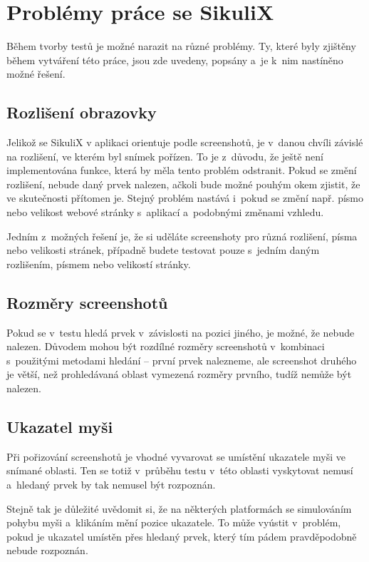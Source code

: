 \chapter{Problémy práce se SikuliX}
Během tvorby testů je možné narazit na různé problémy. Ty, které byly zjištěny během vytváření této práce, jsou zde uvedeny, popsány a~je k~nim nastíněno možné řešení.

	\section{Rozlišení obrazovky}
	Jelikož se SikuliX v aplikaci orientuje podle screenshotů, je v~danou chvíli závislé na rozlišení, ve kterém byl snímek pořízen. To je z~důvodu, že ještě není implementována funkce, která by měla tento problém odstranit. Pokud se změní rozlišení, nebude daný prvek nalezen, ačkoli bude možné pouhým okem zjistit, že ve skutečnosti přítomen je. Stejný problém nastává i~pokud se změní např. písmo nebo velikost webové stránky s~aplikací a~podobnými změnami vzhledu.
	
	Jedním z~možných řešení je, že si uděláte screenshoty pro různá rozlišení, písma nebo velikosti stránek, případně budete testovat pouze s~jedním daným rozlišením, písmem nebo velikostí stránky.
	
	\section{Rozměry screenshotů}
	Pokud se v~testu hledá prvek v~závislosti na pozici jiného, je možné, že nebude nalezen. Důvodem mohou být rozdílné rozměry screenshotů v~kombinaci s~použitými metodami hledání -- první prvek nalezneme, ale screenshot druhého je větší, než prohledávaná oblast vymezená rozměry prvního, tudíž nemůže být nalezen.
	
	\section{Ukazatel myši}
	Při pořizování screenshotů je vhodné vyvarovat se umístění ukazatele myši ve snímané oblasti. Ten se totiž v~průběhu testu v~této oblasti vyskytovat nemusí a~hledaný prvek by tak nemusel být rozpoznán.
	
	Stejně tak je důležité uvědomit si, že na některých platformách se simulováním pohybu myši a~klikáním mění pozice ukazatele. To může vyústit v~problém, pokud je ukazatel umístěn přes hledaný prvek, který tím pádem pravděpodobně nebude rozpoznán.
	
